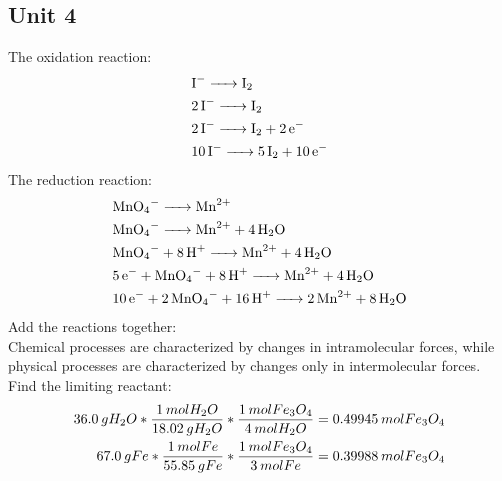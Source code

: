 \documentclass[../main.tex]{subfiles}
\begin{document}
\subsection{Unit 4}
\AnswerSet
{}
\AnswerSet
The oxidation reaction: \\
\begin{equation*}
\begin{aligned}
& \ce{I- -> I2} \\
& \ce{2I- -> I2}\\
& \ce{2I- -> I2 + 2e-} \\
& \ce{10I- -> 5I2 + 10e-}
\end{aligned}
\end{equation*}
The reduction reaction:
\begin{equation*}
    \begin{aligned}
        & \ce{MnO4- -> Mn^{2+}} \\
        & \ce{MnO4- -> Mn^{2+} + 4H2O}\\
        & \ce{MnO4- + 8H+ -> Mn^{2+} + 4H2O} \\
        & \ce{5e- + MnO4- + 8H+ -> Mn^{2+} + 4H2O} \\
        & \ce{10e- + 2MnO4- + 16H+ -> 2Mn^{2+} + 8H2O}
    \end{aligned}
\end{equation*}
Add the reactions together: \\
\AnswerSet
{}
\AnswerSet
Chemical processes are characterized by changes in intramolecular forces, while physical processes are characterized by changes only in intermolecular forces.
\AnswerSet
Find the limiting reactant:
\begin{equation}
    \begin{split}
        36.0\hspace{0.2em}gH_{2}O * \frac{1\hspace{0.2em}molH_{2}O}{18.02\hspace{0.2em}gH_{2}O} *\frac{1\hspace{0.2em}molFe_{3}O_{4}}{4\hspace{0.2em}molH_{2}O} = 0.49945 \hspace{0.2em}mol Fe_{3}O_{4}\\
        67.0\hspace{0.2em}gFe * \frac{1\hspace{0.2em}molFe}{55.85\hspace{0.2em}gFe} * \frac{1\hspace{0.2em}mol Fe_{3}O_{4}}{3\hspace{0.2em}molFe} = 0.39988\hspace{0.2em}mol Fe_{3}O_{4}
    \end{split}
\end{equation}
\end{document}
